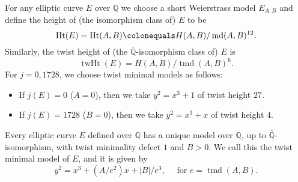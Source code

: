 \documentclass[12pt]{amsart}
\numberwithin{equation}{section} %
\theoremstyle{definition} \newtheorem{definition}[counter]{Definition}
\theoremstyle{remark} \newtheorem{nonexam}[counter]{Non-example}
\newcommand{\QQ}{\mathbb{Q}} %
\newcommand{\Qbar}{\bar{\QQ}} %
\newcommand{\cdef}[1]{\textsf{#1}} %
\DeclareMathOperator{\height}{Ht} %
\DeclareMathOperator{\mind}{md} %
\DeclareMathOperator{\twmind}{tmd} %
\DeclareMathOperator{\twht}{twHt} %
\begin{document}
For any elliptic curve $E$ over $\QQ$ we choose a short Weierstrass model
$E_{A,B}$ and define the \cdef{height} of (the isomorphism class of) $E$ to be
\begin{equation}
    \label{eq:height}
    \height(E) = \height(A,B) \colonequals H(A,B)/\mind(A,B)^{12}.
\end{equation}
Similarly, the \cdef{twist height} of (the $\Qbar$-isomorphism class of) $E$ is
\begin{equation}
    \label{eq:twist-height}
    \twht(E) = H(A,B)/\twmind(A,B)^{6}.
\end{equation}
For $j = 0, 1728$, we choose twist minimal models as follows:
\begin{itemize}
\item If $j(E) = 0$ ($A =0$), then we take $y^2 = x^3 + 1$ of \cdef{twist
    height} $27$.
\item If $j(E) = 1728$ ($B=0$), then we take $y^2 = x^3 + x$ of \cdef{twist
    height} $4$.
\end{itemize}
Every elliptic curve $E$ defined over $\QQ$ has a unique model over $\QQ$, up
to $\Qbar$-isomorphism, with twist minimality defect $1$ and $B > 0$. We call
this the \cdef{twist minimal model} of $E$, and it is given by
\begin{equation}
    \label{eq:twist-minimal-model}
    y^2 = x^3 + (A/e^2)x + |B|/e^3, \quad \text{ for } e = \twmind(A,B).
\end{equation}
\end{document}

